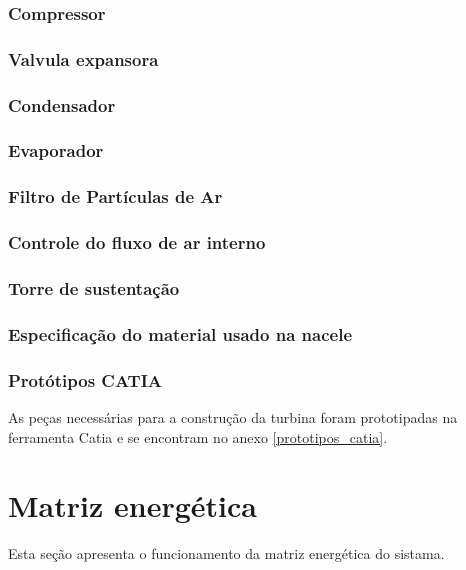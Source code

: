     	\subsubsection{Compressor}
		
	\subsubsection{Valvula expansora}
		
	\subsubsection{Condensador}
		
	\subsubsection{Evaporador}
		
	\subsubsection{Filtro de Partículas de Ar}
		
	\subsubsection{Controle do fluxo de ar interno}
		
	\subsubsection{Torre de sustentação}
		
	\subsubsection{Especificação do material usado na nacele}
		
	\subsubsection{Protótipos CATIA}
	  As peças necessárias para a construção da turbina foram prototipadas na ferramenta Catia \textregistered  e se encontram no 
	  anexo \ref{prototipos_catia}.
  
  \vfill
  \pagebreak
  \section{Matriz energética}
      
      Esta seção apresenta o funcionamento da matriz energética do sistama.
      
